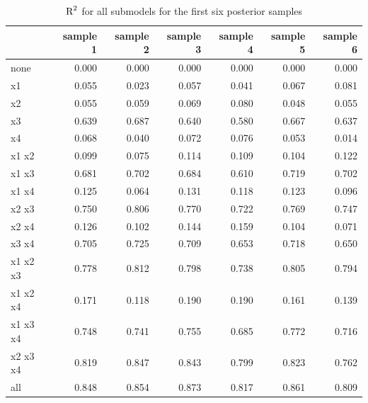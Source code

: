 \documentclass[11pt,a4paper,twoside]{book}
\newenvironment{knitrout}{}{} %
\begin{document}
\begin{knitrout}
\color{fgcolor}\begin{table}

\caption{\label{tab:simdata.postsample3}$ \text{R}^2$ for all submodels for the first six posterior samples}
\centering
\begin{tabular}[t]{lrrrrrr}
\toprule
  & sample 1 & sample 2 & sample 3 & sample 4 & sample 5 & sample 6\\
\midrule
none & 0.000 & 0.000 & 0.000 & 0.000 & 0.000 & 0.000\\
x1 & 0.055 & 0.023 & 0.057 & 0.041 & 0.067 & 0.081\\
x2 & 0.055 & 0.059 & 0.069 & 0.080 & 0.048 & 0.055\\
x3 & 0.639 & 0.687 & 0.640 & 0.580 & 0.667 & 0.637\\
x4 & 0.068 & 0.040 & 0.072 & 0.076 & 0.053 & 0.014\\
x1 x2 & 0.099 & 0.075 & 0.114 & 0.109 & 0.104 & 0.122\\
x1 x3 & 0.681 & 0.702 & 0.684 & 0.610 & 0.719 & 0.702\\
x1 x4 & 0.125 & 0.064 & 0.131 & 0.118 & 0.123 & 0.096\\
x2 x3 & 0.750 & 0.806 & 0.770 & 0.722 & 0.769 & 0.747\\
x2 x4 & 0.126 & 0.102 & 0.144 & 0.159 & 0.104 & 0.071\\
x3 x4 & 0.705 & 0.725 & 0.709 & 0.653 & 0.718 & 0.650\\
x1 x2 x3 & 0.778 & 0.812 & 0.798 & 0.738 & 0.805 & 0.794\\
x1 x2 x4 & 0.171 & 0.118 & 0.190 & 0.190 & 0.161 & 0.139\\
x1 x3 x4 & 0.748 & 0.741 & 0.755 & 0.685 & 0.772 & 0.716\\
x2 x3 x4 & 0.819 & 0.847 & 0.843 & 0.799 & 0.823 & 0.762\\
all & 0.848 & 0.854 & 0.873 & 0.817 & 0.861 & 0.809\\
\bottomrule
\end{tabular}
\end{table}


\end{knitrout}
\end{document}
